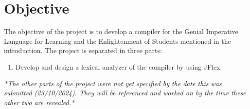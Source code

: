 \setcounter{secnumdepth}{2}

\chapter{Objective}

The objective of the project is to develop a compiler for the Genial Imperative Language for Learning and the Enlightenment of Students mentioned in the introduction.
The project is separated in three parts:

\begin{enumerate}
    \item Develop and design a lexical analyzer of the compiler by using JFlex.
\end{enumerate}

\begin{center}
    \textit{*The other parts of the project were not yet specified by the date this was submitted (23/10/2024). They will be referenced and worked on by the time these other two are revealed.*}
\end{center}